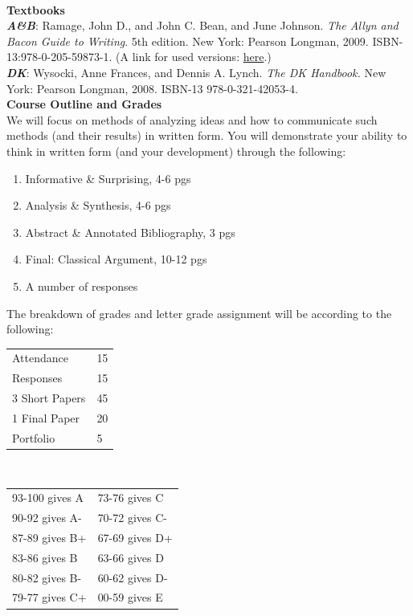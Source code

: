 \documentclass[11pt]{article}
\begin{document}
   \ \\


   {\bf Textbooks}\\
{\bf \textsl {A\&B}}: Ramage, John D., and John C. Bean, and June Johnson. {\sl The Allyn and Bacon Guide to 
Writing}. 5th edition. New York: Pearson Longman, 2009. ISBN-13:978-0-205-59873-1. 
(A link for used versions:  \href{http://www.amazon.com/Allyn-Bacon-Guide-Writing-MyCompLab/dp/0205598730/ref=sr
_1_3/175-1452668-8158623?ie=UTF8&s=books&qid=1245772101&sr=1-3}{here}.) \\
{\bf \textsl {DK}}: Wysocki, Anne Frances, and Dennis A. Lynch. {\sl The DK Handbook.} New York: Pearson Longman, 
2008. ISBN-13 978-0-321-42053-4. 
   \ \\

   {\bf Course Outline and Grades}\\
   We will focus on methods of analyzing ideas and how to communicate such methods (and their results) in written form. You will demonstrate your ability to think in written form (and your development) through the following:
   \begin{enumerate}
     \item Informative \& Surprising, 4-6 pgs
     \item Analysis \& Synthesis, 4-6 pgs
     \item Abstract \& Annotated Bibliography, 3 pgs
     \item Final: Classical Argument, 10-12 pgs
     \item A number of responses
   \end{enumerate}

The breakdown of grades and letter grade assignment will be according to the following:
\vskip 2mm
  
\begin{tabular}{|l|l|}
\hline
Attendance & 15\\
Responses & 15\\
3 Short Papers & 45\\
1 Final Paper & 20\\
Portfolio & 5\\
\hline
\end{tabular} \  \  \  \  \ \begin{tabular}{|l|l|}
   \hline
   93-100 gives A &  73-76 gives C\\
   90-92 gives A- & 70-72 gives C-\\
   87-89 gives B+ & 67-69 gives D+\\
   83-86 gives B & 63-66 gives D\\
   80-82 gives B- & 60-62 gives D-\\
   79-77 gives C+ & 00-59 gives E\\
   \hline 
   \end{tabular}
   \ \\
\end{document}
